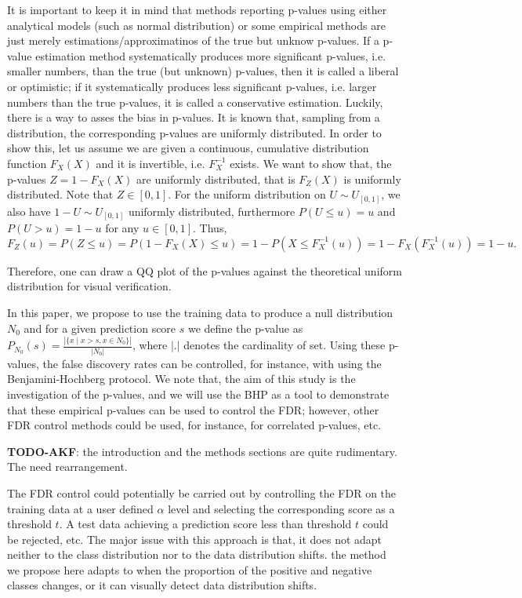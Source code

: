 \documentclass{article}
\newcommand{\todo}[2]{{\color{red} {\bf TODO-#1}: #2}}
\begin{document}
It is important to keep it in mind that methods reporting p-values using either analytical models (such as normal distribution) or some empirical methods are just merely estimations/approximatinos of the true but unknow p-values. If a p-value estimation method systematically produces more significant p-values, i.e. smaller numbers, than the true (but unknown) p-values, then it is called a liberal or optimistic; if it systematically produces less significant p-values, i.e. larger numbers than the true p-values, it is called a conservative estimation. Luckily, there is a way to asses the bias in p-values. It is known that, sampling from a distribution, the corresponding p-values are uniformly distributed. In order to show this, let us assume we are given a continuous, cumulative distribution function $F_X(X)$ and it is invertible, i.e. $F_X^{-1}$ exists. We want to show that, the p-values $Z = 1-F_X(X)$ are uniformly distributed, that is $F_Z(X)$ is uniformly distributed. Note that $Z\in [0,1]$. For the uniform distribution on $U\sim U_{[0,1]}$, we also have $1-U\sim U_{[0,1]}$ uniformly distributed, furthermore $P(U\le u)=u$ and $P(U>u) = 1-u$ for any $u\in[0,1]$. Thus,
\begin{equation}
	F_Z(u)=P(Z \le u) = P(1-F_X(X)\le u)= 1-P(X\le F_X^{-1}(u))=1-F_X(F_X^{-1}(u))=1-u.
\end{equation}

Therefore, one can draw a QQ plot of the p-values against the theoretical uniform distribution for visual verification.

In this paper, we propose to use the training data to produce a null distribution $N_0$ and for a given prediction score $s$ we define the p-value as $P_{N_0}(s)=\frac{|\{x\mid x>s, x \in N_0\}|}{|N_0|}$, where $|.|$ denotes the cardinality of set. Using these p-values, the false discovery rates can be controlled, for instance, with using the Benjamini-Hochberg protocol. We note that, the aim of this study is the investigation of the p-values, and we will use the BHP as a tool to demonstrate that these empirical p-values can be used to control the FDR; however, other FDR control methods could be used, for instance, for correlated p-values, etc. 

\todo{AKF}{the introduction and the methods sections are quite rudimentary. The need rearrangement.}

The FDR control could potentially be carried out by controlling the FDR on the training data at a user defined $\alpha$ level and selecting the corresponding score as a threshold $t$. A test data achieving a prediction score less than threshold $t$ could be rejected, etc. The major issue with this approach is that, it does not adapt neither to the class distribution nor to the data distribution shifts. the method we propose here adapts to when the proportion of the positive and negative classes changes, or it can visually detect data distribution shifts. 
\end{document}
